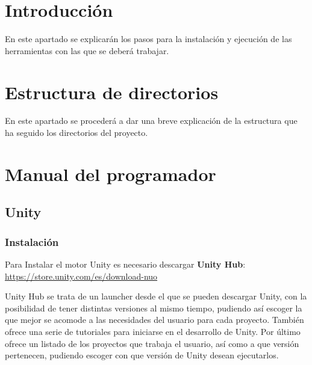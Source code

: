 
\section{Introducción}
En este apartado se explicarán los pasos para la instalación y ejecución de las herramientas con las que se deberá trabajar.
\section{Estructura de directorios}
En este apartado se procederá a dar una breve explicación de la estructura que ha seguido los directorios del proyecto.\\
\newpage
{}



\section{Manual del programador}

\subsection{Unity}\label{sub:Unity}

\subsubsection{Instalación}

Para Instalar el motor Unity es necesario descargar \textbf{Unity Hub}:\\ \url{https://store.unity.com/es/download-nuo}

Unity Hub se trata de un launcher desde el que se pueden descargar Unity, con la posibilidad de tener distintas versiones al mismo tiempo, pudiendo así escoger la que mejor se acomode a las necesidades del usuario para cada proyecto. También ofrece una serie de tutoriales para iniciarse en el desarrollo de Unity. Por último ofrece un listado de los proyectos que trabaja el usuario, así como a que versión pertenecen, pudiendo escoger con que versión de Unity desean ejecutarlos.

